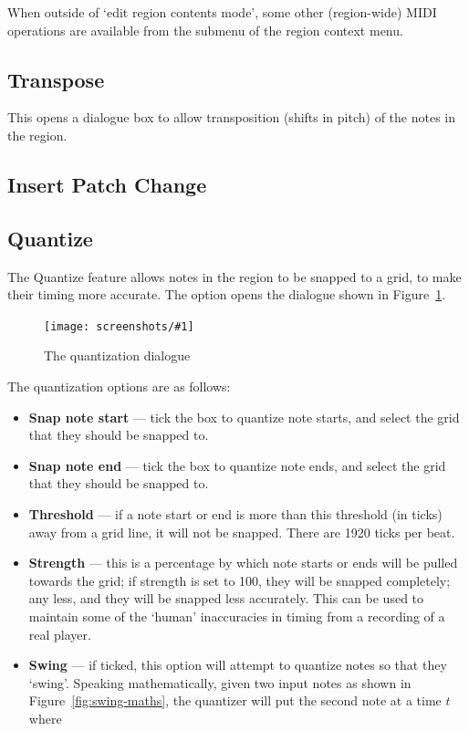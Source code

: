 \documentclass[10pt,a4paper]{book}
\newcommand{\menu}[1]{\emph{\StrSubstitute{#1}{,}{ $\rightarrow$ }}}
\newcommand{\todo}[1]{\marginpar{\small\texttt{#1}}}
\newcommand{\screenshot}[3]{%
\begin{figure}[ht]%
\begin{center}
\texttt{[image: screenshots/\#1]}
\end{center}
\caption{#2}
\label{#3}
\end{figure}}
\begin{document}
{When outside of `edit region contents mode', some other (region-wide)
MIDI operations are available from the \menu{MIDI} submenu of the
region context menu.

\subsection{Transpose}

This opens a dialogue box to allow transposition (shifts in pitch) of
the notes in the region.

\subsection{Insert Patch Change}

\todo{hmm}

\subsection{Quantize}

The Quantize feature allows notes in the region to be snapped to a
grid, to make their timing more accurate.  The \menu{Quantize\ldots}
option opens the dialogue shown in Figure~\ref{fig:quantize}.

\screenshot{quantize.png}{The quantization dialogue}{fig:quantize}

The quantization options are as follows:

\begin{itemize}
\item \textbf{Snap note start} --- tick the box to quantize note
  starts, and select the grid that they should be snapped to.
\item \textbf{Snap note end} --- tick the box to quantize note
  ends, and select the grid that they should be snapped to.
\item \textbf{Threshold} --- if a note start or end is more than this
  threshold (in ticks) away from a grid line, it will not be snapped.
  There are 1920 ticks per beat.
\item \textbf{Strength} --- this is a percentage by which note starts
  or ends will be pulled towards the grid; if strength is set to 100,
  they will be snapped completely; any less, and they will be snapped
  less accurately.  This can be used to maintain some of the `human'
  inaccuracies in timing from a recording of a real player.
\item \textbf{Swing} --- if ticked, this option will attempt to
  quantize notes so that they `swing'.  Speaking mathematically, given
  two input notes as shown in Figure~\ref{fig:swing-maths}, the
  quantizer will put the second note at a time $t$ where


\end{itemize}}
\end{document}
